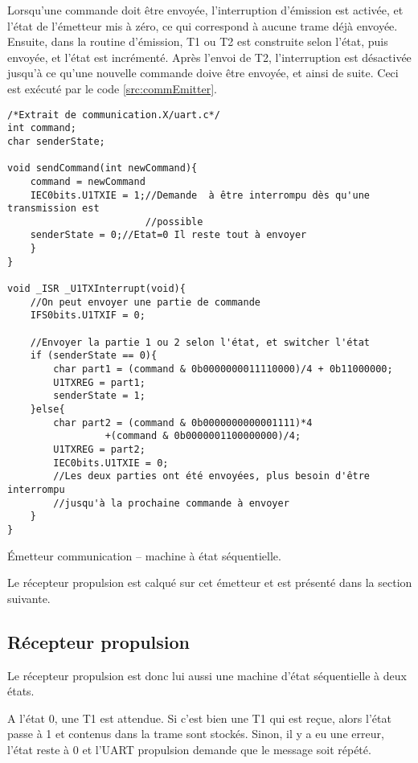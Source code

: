 Lorsqu'une commande doit être envoyée, l'interruption d'émission est activée, et l'état de l'émetteur mis à zéro, ce qui correspond à aucune trame déjà envoyée. Ensuite, dans la routine d'émission, T1 ou T2 est construite selon l'état, puis envoyée, et l'état est incrémenté. Après l'envoi de T2, l'interruption est désactivée jusqu'à ce qu'une nouvelle commande doive être envoyée, et ainsi de suite. Ceci est exécuté par le code \ref{src:commEmitter}.
\begin{listing}[htbp]
\begin{verbatim}
/*Extrait de communication.X/uart.c*/
int command;
char senderState;

void sendCommand(int newCommand){
    command = newCommand
    IEC0bits.U1TXIE = 1;//Demande  à être interrompu dès qu'une transmission est
                        //possible
    senderState = 0;//Etat=0 Il reste tout à envoyer
    }
}

void _ISR _U1TXInterrupt(void){
    //On peut envoyer une partie de commande
    IFS0bits.U1TXIF = 0;

    //Envoyer la partie 1 ou 2 selon l'état, et switcher l'état
    if (senderState == 0){
        char part1 = (command & 0b0000000011110000)/4 + 0b11000000;
        U1TXREG = part1;
        senderState = 1;
    }else{
        char part2 = (command & 0b0000000000001111)*4
                 +(command & 0b0000001100000000)/4;
        U1TXREG = part2;
        IEC0bits.U1TXIE = 0;
        //Les deux parties ont été envoyées, plus besoin d'être interrompu
        //jusqu'à la prochaine commande à envoyer
    }
}
\end{verbatim}
\caption{\'Emetteur communication -- machine à état séquentielle.\label{src:commEmitter}}
\end{listing}

Le récepteur propulsion est calqué sur cet émetteur et est présenté dans la section suivante.

\subsection{Récepteur propulsion\label{subsec:propReceptor}}
Le récepteur propulsion est donc lui aussi une machine d'état séquentielle à deux états.

A l'état 0, une T1 est attendue. Si c'est bien une T1 qui est reçue, alors l'état passe à 1 et  contenus dans la trame sont stockés. Sinon, il y a eu une erreur, l'état reste à 0 et l'UART propulsion demande que le message soit répété.

